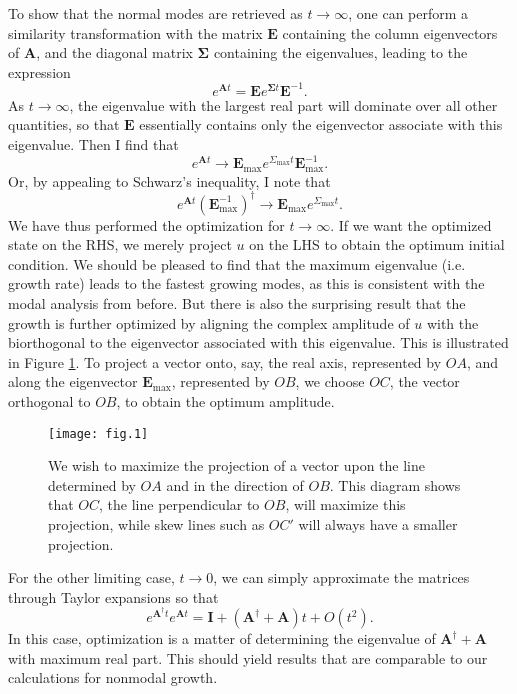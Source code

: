 \documentclass[letterpaper,11pt,onecolumn,twoside,titlepage]{article}
\begin{document}
To show that the normal modes are retrieved as $t \rightarrow \infty$, one can perform a similarity transformation with the matrix $\mathbf{E}$ containing the column eigenvectors of $\mathbf{A}$, and the diagonal matrix $\mathbf{\Sigma}$ containing the eigenvalues, leading to the expression
\[
e^{\mathbf{A} t} = \mathbf{E} e^{\mathbf{\Sigma} t} \mathbf{E}^{-1}.
\]
As $t \rightarrow \infty$, the eigenvalue with the largest real part will dominate over all other quantities, so that $\mathbf{E}$ essentially contains only the eigenvector associate with this eigenvalue. Then I find that
\[
e^{\mathbf{A} t} \rightarrow \mathbf{E}_\text{max} e^{\Sigma_\text{max} t} \mathbf{E}_\text{max}^{-1}.
\]
Or, by appealing to Schwarz's inequality, I note that
\[
e^{\mathbf{A} t} (\mathbf{E}_\text{max}^{-1})^{\dag} \rightarrow \mathbf{E}_\text{max} e^{\Sigma_\text{max} t}.
\]
We have thus performed the optimization for $t \rightarrow \infty$. If we want the optimized state on the RHS, we merely project $u$ on the LHS to obtain the optimum initial condition. We should be pleased to find that the maximum eigenvalue (i.e. growth rate) leads to the fastest growing modes, as this is consistent with the modal analysis from before. But there is also the surprising result that the growth is further optimized by aligning the complex amplitude of $u$ with the biorthogonal to the eigenvector associated with this eigenvalue. This is illustrated in Figure \ref{Fig:Projection}. To project a vector onto, say, the real axis, represented by $OA$, and along the eigenvector $\mathbf{E}_\text{max}$, represented by $OB$, we choose $OC$, the vector orthogonal to $OB$, to obtain the optimum amplitude.

\begin{figure}[h]
\begin{center}
\texttt{[image: fig.1]}
\caption{We wish to maximize the projection of a vector upon the line determined by $OA$ and in the direction of $OB$. This diagram shows that $OC$, the line perpendicular to $OB$, will maximize this projection, while skew lines such as $OC'$ will always have a smaller projection.}\label{Fig:Projection}
\end{center}
\end{figure}

For the other limiting case, $t \rightarrow 0$, we can simply approximate the matrices through Taylor expansions so that
\[
e^{\mathbf{A}^\dag t} e^{\mathbf{A} t} = \mathbf{I} + (\mathbf{A}^\dag + \mathbf{A}) t + O(t^2).
\]
In this case, optimization is a matter of determining the eigenvalue of $\mathbf{A}^\dag + \mathbf{A}$ with maximum real part. This should yield results that are comparable to our calculations for nonmodal growth.
\end{document}
